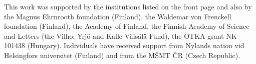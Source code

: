
This work was supported by the institutions listed on the front page and also by the 
Magnus Ehrnrooth foundation (Finland), the Waldemar von Frenckell foundation (Finland), 
the Academy of Finland, the Finnish Academy of Science and Letters (the Vilho, Yrj\"o and Kalle V\"ais\"al\"a Fund), 
the OTKA grant NK 101438 (Hungary). Individuals have received support from Nylands nation vid Helsingfors universitet (Finland) 
and from the M\v SMT \v CR (Czech Republic).

